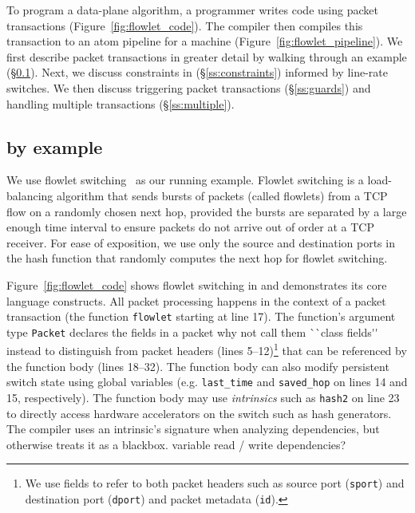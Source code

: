 To program a data-plane algorithm, a programmer writes \pktlanguage code
using packet transactions (Figure~\ref{fig:flowlet_code}).  The
\pktlanguage compiler then compiles this transaction to an atom pipeline for a
\absmachine machine (Figure~\ref{fig:flowlet_pipeline}). We first describe
packet transactions in greater detail by walking through an example
(\S\ref{ss:flowlet}). Next, we discuss constraints in \pktlanguage
(\S\ref{ss:constraints}) informed by line-rate switches.  We then discuss
triggering packet transactions (\S\ref{ss:guards}) and handling multiple
transactions (\S\ref{ss:multiple}).

\subsection{\pktlanguage by example}
\label{ss:flowlet}

We use flowlet switching~\cite{flowlets} as our running example. Flowlet
switching is a load-balancing algorithm that sends bursts of packets (called
flowlets) from a TCP flow on a randomly chosen next hop, provided the bursts
are separated by a large enough time interval to ensure packets do not arrive
out of order at a TCP receiver. For ease of exposition, we use only the source
and destination ports in the hash function that randomly computes the next hop
for flowlet switching.

Figure~\ref{fig:flowlet_code} shows flowlet switching in \pktlanguage and
demonstrates its core language constructs. All packet processing happens in the
context of a packet transaction (the function \texttt{flowlet} starting at line
17). The function's argument type {\tt Packet} declares the fields in a packet
\ac{why not call them ``class fields'' instead to distinguish from packet headers}
(lines 5--12)\footnote{We use fields to refer to both packet headers such as
source port ({\tt sport}) and destination port ({\tt dport}) and packet
metadata ({\tt id}).} that can be referenced by the function body (lines
18--32).  The function body can also modify persistent switch state using
global variables (e.g.  \texttt{last\_time} and \texttt{saved\_hop} on lines 14
and 15, respectively). The function body may use \textit{intrinsics} such as
\texttt{hash2} on line 23 to directly access hardware accelerators on the
switch such as hash generators.  The \pktlanguage compiler uses an intrinsic's
signature when analyzing dependencies, but otherwise treats it as a blackbox.
\ac{variable read / write dependencies?}

